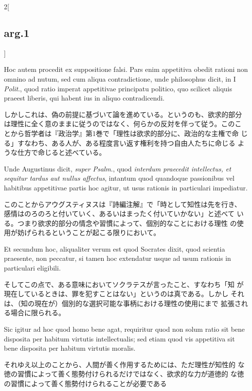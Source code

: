 \documentclass[paper=a4paper,fontsize=10pt,jafontsize=9pt,titlepage]{jlreq}
\begin{document}
\begin{paracol}{2}[\subsection{arg.1}]
\switchcolumn*

Hoc autem procedit ex suppositione falsi. Pars enim appetitiva obedit
 rationi non omnino ad nutum, sed cum aliqua contradictione, unde
 philosophus dicit, in I {\itshape Polit}., quod ratio imperat appetitivae
 principatu politico, quo scilicet aliquis praeest liberis, qui habent
 ius in aliquo contradicendi.

\switchcolumn

しかしこれは、偽の前提に基づいて論を進めている。というのも、欲求的部分
は理性に全く意のままに従うのではなく、何らかの反対を伴って従う。このこ
とから哲学者は『政治学』第1巻で「理性は欲求的部分に、政治的な主権で命
じる」すなわち、ある人が、ある程度言い返す権利を持つ自由人たちに命じる
ような仕方で命じると述べている。

\switchcolumn*

Unde Augustinus dicit, {\itshape super Psalm}., quod {\itshape
 interdum praecedit intellectus, et sequitur tardus aut nullus
 affectus}, intantum quod quandoque passionibus vel habitibus
 appetitivae partis hoc agitur, ut usus rationis in particulari
 impediatur.

\switchcolumn

このことからアウグスティヌスは『詩編注解』で「時として知性は先を行き、
 感情はのろのろと付いていく、あるいはまったく付いていかない」と述べて
 いる。つまり欲求的部分の情念や習慣によって、個別的なことにおける理性
 の使用が妨げられるということが起こる限りにおいて。

\switchcolumn*

Et secundum hoc, aliqualiter verum est quod Socrates dixit, quod
 scientia praesente, non peccatur, si tamen hoc extendatur usque ad
 usum rationis in particulari eligibili.

\switchcolumn

そしてこの点で、ある意味においてソクラテスが言ったこと、すなわち「知
 が現在しているときは、罪を犯すことはない」というのは真である。しかし
 それは、（知の現在が）個別的な選択可能な事柄における理性の使用にまで
 拡張される場合に限られる。

\switchcolumn*

Sic igitur ad hoc quod homo bene agat, requiritur quod non solum
 ratio sit bene disposita per habitum virtutis intellectualis; sed
 etiam quod vis appetitiva sit bene disposita per habitum virtutis
 moralis.

\switchcolumn

それゆえ以上のことから、人間が善く作用するためには、ただ理性が知性的
 な徳の習慣によって善く態勢付けられるだけではなく、欲求的な力が道徳的
 な徳の習慣によって善く態勢付けられることが必要である


\end{paracol}
\end{document}
